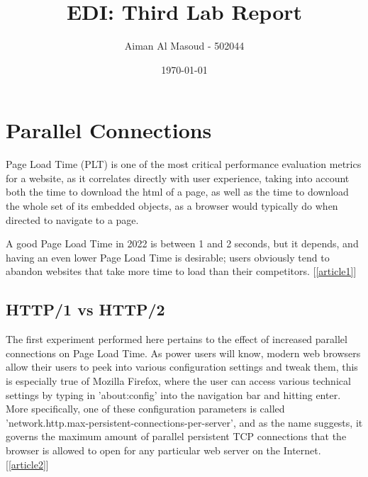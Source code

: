 \documentclass[a4paper,10pt]{article}
\begin{document}
\title{EDI: Third Lab Report}
\author{Aiman Al Masoud - 502044}
\date{\today}

\maketitle

\begin{abstract}
\end{abstract}

\clearpage
\clearpage
\clearpage
\clearpage
\clearpage
\clearpage

\setcounter{page}{1}

\section{Parallel Connections}
% 

Page Load Time (PLT) is one of the most critical performance evaluation metrics for a website, as it correlates directly with user experience, taking into account both the time to download the html of a page, as well as the time to download the whole set of its embedded objects, as a browser would typically do when directed to navigate to a page.

A good Page Load Time in 2022 is between 1 and 2 seconds, but it depends, and having an even lower Page Load Time is desirable; users obviously tend to abandon websites that take more time to load than their competitors. [\ref{article1}] 


\subsection{HTTP/1 vs HTTP/2}

The first experiment performed here pertains to the effect of increased parallel connections on Page Load Time. As power users will know, modern web browsers allow their users to peek into various configuration settings and tweak them, this is especially true of Mozilla Firefox, where the user can access various technical settings by typing in 'about:config' into the navigation bar and hitting enter. More specifically, one of these configuration parameters is called 'network.http.max-persistent-connections-per-server', and as the name suggests, it governs the maximum amount of parallel persistent TCP connections that the browser is allowed to open for any particular web server on the Internet. [\ref{article2}] 
\end{document}
